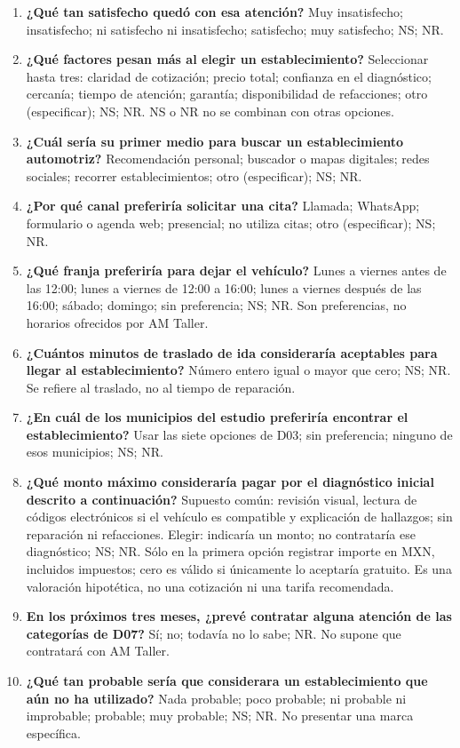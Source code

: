 {\begin{enumerate}
\item[D11.] \textbf{¿Qué tan satisfecho quedó con esa atención?} Muy insatisfecho; insatisfecho; ni satisfecho ni insatisfecho; satisfecho; muy satisfecho; NS; NR.
\item[D12.] \textbf{¿Qué factores pesan más al elegir un establecimiento?} Seleccionar hasta tres: claridad de cotización; precio total; confianza en el diagnóstico; cercanía; tiempo de atención; garantía; disponibilidad de refacciones; otro (especificar); NS; NR. NS o NR no se combinan con otras opciones.
\item[D13.] \textbf{¿Cuál sería su primer medio para buscar un establecimiento automotriz?} Recomendación personal; buscador o mapas digitales; redes sociales; recorrer establecimientos; otro (especificar); NS; NR.
\item[D14.] \textbf{¿Por qué canal preferiría solicitar una cita?} Llamada; WhatsApp; formulario o agenda web; presencial; no utiliza citas; otro (especificar); NS; NR.
\item[D15.] \textbf{¿Qué franja preferiría para dejar el vehículo?} Lunes a viernes antes de las 12:00; lunes a viernes de 12:00 a 16:00; lunes a viernes después de las 16:00; sábado; domingo; sin preferencia; NS; NR. Son preferencias, no horarios ofrecidos por AM Taller.
\item[D16.] \textbf{¿Cuántos minutos de traslado de ida consideraría aceptables para llegar al establecimiento?} Número entero igual o mayor que cero; NS; NR. Se refiere al traslado, no al tiempo de reparación.
\item[D17.] \textbf{¿En cuál de los municipios del estudio preferiría encontrar el establecimiento?} Usar las siete opciones de D03; sin preferencia; ninguno de esos municipios; NS; NR.
\item[D18.] \textbf{¿Qué monto máximo consideraría pagar por el diagnóstico inicial descrito a continuación?} Supuesto común: revisión visual, lectura de códigos electrónicos si el vehículo es compatible y explicación de hallazgos; sin reparación ni refacciones. Elegir: indicaría un monto; no contrataría ese diagnóstico; NS; NR. Sólo en la primera opción registrar importe en MXN, incluidos impuestos; cero es válido si únicamente lo aceptaría gratuito. Es una valoración hipotética, no una cotización ni una tarifa recomendada.
\item[D19.] \textbf{En los próximos tres meses, ¿prevé contratar alguna atención de las categorías de D07?} Sí; no; todavía no lo sabe; NR. No supone que contratará con AM Taller.
\item[D20.] \textbf{¿Qué tan probable sería que considerara un establecimiento que aún no ha utilizado?} Nada probable; poco probable; ni probable ni improbable; probable; muy probable; NS; NR. No presentar una marca específica.

\end{enumerate}}
